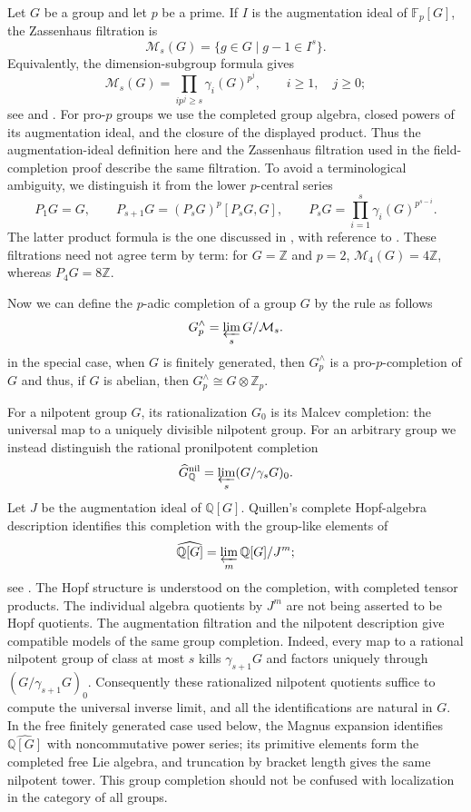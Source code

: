 \documentclass[11pt,a4paper]{article}
\begin{document}
Let $G$ be a group and let $p$ be a prime.  If $I$ is the augmentation
ideal of $\mathbb F_p[G]$, the Zassenhaus filtration is
\[
 \mathcal M_s(G)=\{g\in G\mid g-1\in I^s\}.
\]
Equivalently, the dimension-subgroup formula gives
\[
 \mathcal M_s(G)=\prod_{ip^j\geq s}\gamma_i(G)^{p^j},
 \qquad i\geq1,\quad j\geq0;
\]
see \cite{Rec,Cur} and \cite[Introduction and Section~8]{ChapmanEfrat2016}.
For pro-$p$ groups we use the completed group algebra, closed powers
of its augmentation ideal, and the closure of the displayed product.
Thus the augmentation-ideal definition here and the Zassenhaus
filtration used in the field-completion proof describe the same
filtration.  To avoid a terminological ambiguity, we distinguish it
from the lower $p$-central series
\[
 P_1G=G,\qquad P_{s+1}G=(P_sG)^p[P_sG,G],\qquad
 P_sG=\prod_{i=1}^s\gamma_i(G)^{p^{s-i}}.
\]
The latter product formula is the one discussed in
\cite[Introduction and Corollary~7.5]{ChapmanEfrat2016}, with reference
to \cite[Proposition~3.8.6]{NSW}.  These filtrations need not agree
term by term: for $G=\mathbb Z$ and $p=2$,
$\mathcal M_4(G)=4\mathbb Z$, whereas $P_4G=8\mathbb Z$.

Now we can define the $p$-adic completion of a group $G$ by the rule as follows $$G^{\wedge}_p = \varprojlim_s G/\mathcal{M}_s.$$
in the special case, when $G$ is finitely generated, then  $G^{\wedge}_p$ is a pro-$p$-completion of $G$ and thus, if $G$ is abelian, then $G^{\wedge}_p\cong G\otimes \mathbb{Z}_p$.

For a nilpotent group $G$, its rationalization $G_0$ is its Malcev
completion: the universal map to a uniquely divisible nilpotent group.
For an arbitrary group we instead distinguish the rational pronilpotent
completion
\[
 \widehat G_{\mathbb Q}^{\mathrm{nil}}
 =\varprojlim_s(G/\gamma_sG)_0.
\]
Let $J$ be the augmentation ideal of $\mathbb Q[G]$.  Quillen's
complete Hopf-algebra description identifies this completion with
the group-like elements of
\[
 \widehat{\mathbb Q[G]}=\varprojlim_m\mathbb Q[G]/J^m;
\]
see \cite[Appendix~A, Section~3]{Qui5}.  The Hopf structure is understood
on the completion, with completed tensor products.  The individual
algebra quotients by $J^m$ are not being asserted to be Hopf quotients.
The augmentation filtration and the nilpotent description give
compatible models of the same group completion.  Indeed, every map
to a rational nilpotent group of class at most $s$ kills
$\gamma_{s+1}G$ and factors uniquely through $(G/\gamma_{s+1}G)_0$.
Consequently these rationalized nilpotent quotients suffice to compute
the universal inverse limit, and all the identifications are natural
in $G$.  In the free finitely generated case used below, the Magnus
expansion identifies $\widehat{\mathbb Q[G]}$ with noncommutative power
series; its primitive elements form the completed free Lie algebra,
and truncation by bracket length gives the same nilpotent tower.
This group completion should not be confused with localization in
the category of all groups.
\end{document}
